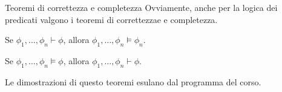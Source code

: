 \documentclass[aspectratio=169,10pt,dvipsnames,xcolor=table]{beamer}
\begin{document}
\begin{frame}{Teoremi di correttezza e completezza}
    Ovviamente, anche per la logica dei predicati valgono i teoremi di correttezzae e completezza.

    \begin{theorem}
        Se $\phi_1, \ldots, \phi_n \vdash \phi$, allora $\phi_1, \ldots, \phi_n \models \phi_n$.
    \end{theorem}

    \begin{theorem}
        Se $\phi_1, \ldots, \phi_n \models \phi$, allora $\phi_1, \ldots, \phi_n \vdash \phi$.
    \end{theorem}

    \medskip
    Le dimostrazioni di questo teoremi esulano dal programma del corso.
\end{frame}
\end{document}
